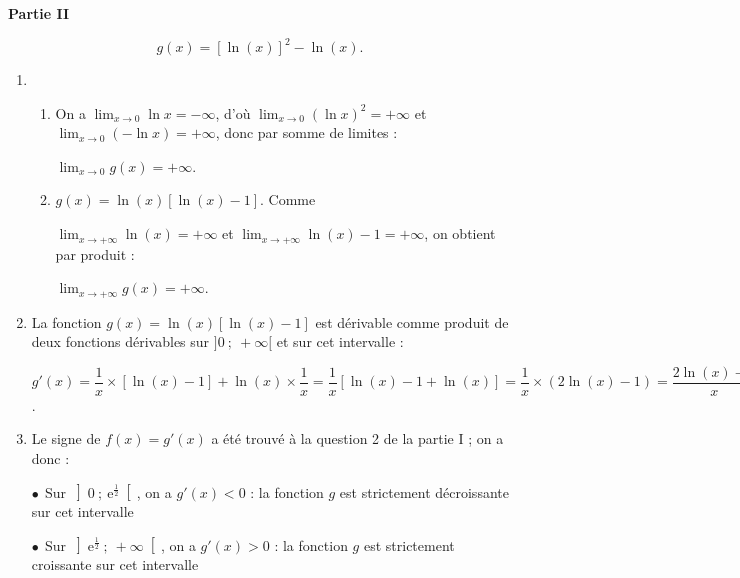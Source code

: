 \bigskip

\textbf{Partie II}

\medskip


\[g(x) = [\ln (x)]^2 - \ln (x).\]

\begin{enumerate}
\item 
	\begin{enumerate}
		\item %
On a $\displaystyle\lim_{x \to 0} \ln x = - \infty$, d'où $\displaystyle\lim_{x \to 0} (\ln x)^2 = + \infty$ et $\displaystyle\lim_{x \to 0} (-\ln x) = + \infty$, donc par somme de limites :
		
$\displaystyle\lim_{x \to 0} g(x) = + \infty$.
		\item %
$g(x) = \ln (x) [\ln (x) - 1]$. Comme 

$\displaystyle\lim_{x \to + \infty} \ln (x)  = + \infty$ et $\displaystyle\lim_{x \to + \infty} \ln (x)  - 1 = + \infty$, on obtient par produit :

$\displaystyle\lim_{x \to + \infty} g(x)  = + \infty$.
	\end{enumerate}
\item %
La fonction $g(x) = \ln (x) [\ln (x) - 1]$ est dérivable comme produit de deux fonctions dérivables sur $]0~;~+ \infty[$ et sur cet intervalle :

$g'(x) = \dfrac{1}{x} \times [\ln (x) - 1] + \ln (x) \times \dfrac{1}{x} = \dfrac{1}{x} \left[\ln (x) - 1 + \ln (x)\right] = \dfrac{1}{x}\times (2\ln (x) - 1) = \dfrac{2\ln (x) - 1}{x} = f(x)$.
\item %

Le signe de $f(x) = g'(x)$ a été trouvé à la question 2 de la partie I ; on a donc :

$\bullet~~$Sur $\left]0~;~\text{e}^{\frac{1}{2}}\right[$, on a $g'(x) < 0$ : la fonction $g$ est strictement décroissante sur cet intervalle

$\bullet~~$Sur $\left]\text{e}^{\frac{1}{2}}~;~+ \infty\right[$, on a $g'(x) > 0$ : la fonction $g$ est strictement croissante sur cet intervalle


\end{enumerate}
